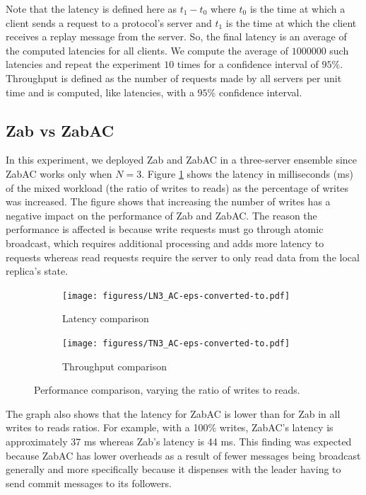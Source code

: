 \documentclass[a4paper,UKenglish]{oasics-v2016}
\begin{document}
Note that the latency is defined here as $t_{1}-t_{0}$ where $t_{0}$ is the time at which a client sends a request to a protocol's server and $t_{1}$ is the time at which the client receives a replay message from the server. So, the final latency is an average of the computed latencies for all clients. We compute the average of $1000000$ such latencies and repeat  the experiment $10$ times for a confidence interval of $95\%$. Throughput is defined as the number of requests made by all servers  per unit time and is computed, like latencies, with a $95\%$ confidence interval. 


\subsection{Zab vs ZabAC}

In this experiment, we deployed Zab and ZabAC in a three-server ensemble since ZabAC works only when $N=3$. Figure \ref{LatencyAC3} shows the latency in milliseconds (ms) of the mixed workload (the ratio of writes to reads) as the percentage of writes was increased. The figure shows that increasing the number of writes has a negative impact on the performance of Zab and ZabAC. The reason the performance is affected is because write requests must go through atomic broadcast, which requires additional processing and adds more latency to requests whereas read requests require the server to only read data from the local replica's state.

 \begin{figure}
    \centering
	\captionsetup[subfigure]{justification=centering}
	\begin{subfigure}{.49\linewidth}
		\texttt{[image: figuress/LN3\_AC-eps-converted-to.pdf]}
		\caption{Latency comparison}
		\label{LatencyAC3}
	\end{subfigure}		
	\begin{subfigure}{.49\linewidth}
		\texttt{[image: figuress/TN3\_AC-eps-converted-to.pdf]}
		\caption{Throughput comparison}
		\label{ThroughpuAC3}
	\end{subfigure}		
\caption{Performance comparison, varying the ratio of writes to reads.}
	\label{latency comparison}
\end{figure}


The graph also shows that the latency for ZabAC is lower than for Zab in all writes to reads ratios. For example, with a 100\% writes, ZabAC's latency is approximately 37 ms whereas Zab's latency is 44 ms. This finding was expected because ZabAC has lower overheads as a result of fewer messages being broadcast generally and more specifically because it dispenses with the leader having to send commit messages to its followers.
\end{document}
